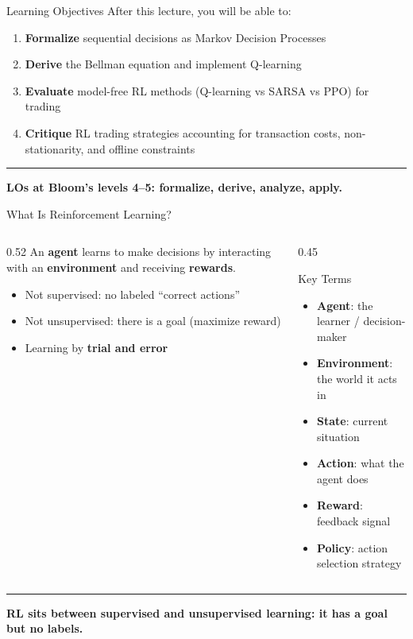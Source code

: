 \documentclass[8pt,aspectratio=169]{beamer}
\newcommand{\bottomnote}[1]{%
\vfill
\vspace{-2mm}
\textcolor{mllavender2}{\rule{\textwidth}{0.4pt}}
\vspace{1mm}
\footnotesize
\textbf{#1}
}
\newenvironment{compactlist}{%
  \begin{itemize}%
    \setlength{\itemsep}{2pt}%
    \setlength{\parskip}{0pt}%
    \setlength{\parsep}{0pt}%
}{%
  \end{itemize}%
}
\newcommand{\highlight}[1]{\textcolor{mlorange}{\textbf{#1}}}
\begin{document}
\begin{frame}{Learning Objectives}
After this lecture, you will be able to:
\begin{enumerate}
  \item \textbf{Formalize} sequential decisions as Markov Decision Processes
  \item \textbf{Derive} the Bellman equation and implement Q-learning
  \item \textbf{Evaluate} model-free RL methods (Q-learning vs SARSA vs PPO) for trading
  \item \textbf{Critique} RL trading strategies accounting for transaction costs, non-stationarity, and offline constraints
\end{enumerate}

\bottomnote{LOs at Bloom's levels 4--5: formalize, derive, analyze, apply.}
\end{frame}

\begin{frame}{What Is Reinforcement Learning?}
\begin{columns}[T]
\begin{column}{0.52\textwidth}
An \highlight{agent} learns to make decisions by interacting with an
\textbf{environment} and receiving \textbf{rewards}.

\vspace{4pt}
\begin{compactlist}
  \item Not supervised: no labeled ``correct actions''
  \item Not unsupervised: there is a goal (maximize reward)
  \item Learning by \textbf{trial and error}
\end{compactlist}
\end{column}
\begin{column}{0.45\textwidth}
\begin{block}{Key Terms}
\begin{compactlist}
  \item \textbf{Agent}: the learner / decision-maker
  \item \textbf{Environment}: the world it acts in
  \item \textbf{State}: current situation
  \item \textbf{Action}: what the agent does
  \item \textbf{Reward}: feedback signal
  \item \textbf{Policy}: action selection strategy
\end{compactlist}
\end{block}
\end{column}
\end{columns}

\bottomnote{RL sits between supervised and unsupervised learning: it has a goal but no labels.}
\end{frame}
\end{document}
